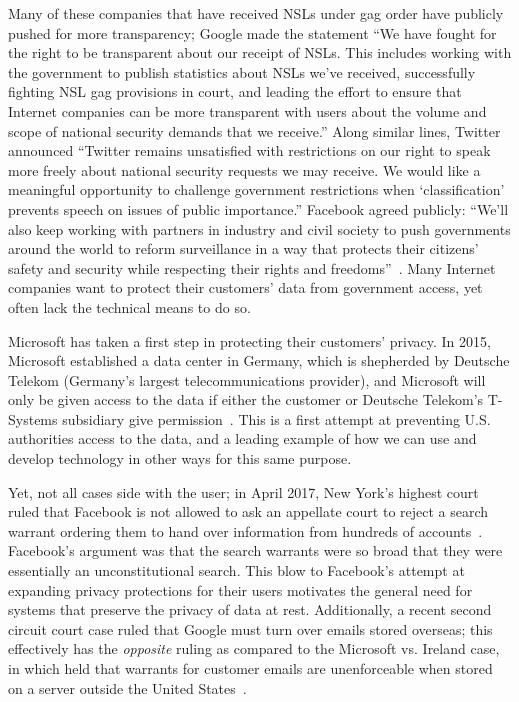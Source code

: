 Many of these companies that have received NSLs under gag order have publicly
pushed for more transparency; Google made the statement ``We have fought for
the right to be transparent about our receipt of NSLs. This includes working
with the government to publish statistics about NSLs we’ve received,
successfully fighting NSL gag provisions in court, and leading the effort to
ensure that Internet companies can be more transparent with users about the
volume and scope of national security demands that we receive.'' Along similar
lines, Twitter announced ``Twitter remains unsatisfied with restrictions on
our right to speak more freely about national security requests we may
receive. We would like a meaningful opportunity to challenge government
restrictions when ‘classification’ prevents speech on issues of public
importance.''  Facebook agreed publicly: ``We'll also keep working with
partners in industry and civil society to push governments around the world to
reform surveillance in a way that protects their citizens’ safety and security
while respecting their rights and freedoms''~\cite{cloudflare_gag}.  
Many Internet companies want to protect their customers' data from
government access, yet often lack the technical means to do so.

Microsoft has taken a first step in protecting their customers' privacy.  In
2015, Microsoft established a data center in Germany, which is shepherded by
Deutsche Telekom (Germany's largest telecommunications provider), and
Microsoft will only be given access to the data if either the customer or
Deutsche Telekom's T-Systems subsidiary give
permission~\cite{microsoft_germany}.  This is a first attempt at preventing
U.S. authorities access to the data, and a leading example of how we can use
and develop technology in other ways for this same purpose.

Yet, not all cases side with the user; in April 2017, New
York's highest court ruled that Facebook is not allowed to ask an appellate
court to reject a search warrant ordering them to hand over information from
hundreds of accounts~\cite{facebook_ny}.  Facebook's argument was that the
search warrants were so broad that they were essentially an unconstitutional
search.  This blow to Facebook's attempt at expanding privacy protections for
their users motivates the general need for systems that preserve the privacy
of data at rest.  Additionally, a recent second circuit court case ruled that
Google must turn over emails stored overseas; this effectively has the {\it
opposite} ruling as compared to the Microsoft vs. Ireland case, in which held
that warrants for customer emails are unenforceable when stored on a server
outside the United States~\cite{google_overseas,microsoft_ireland}.

